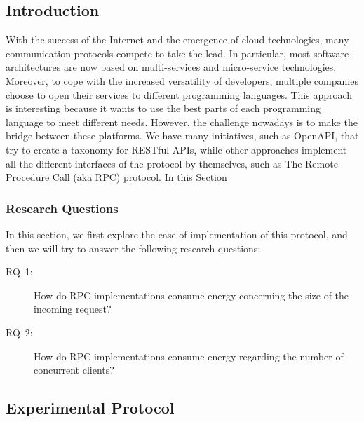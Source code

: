 \subsection{Introduction}
With the success of the Internet and the emergence of cloud technologies, many communication protocols compete to take the lead.
In particular, most software architectures are now based on multi-services and micro-service technologies.
Moreover, to cope with the increased versatility of developers, multiple companies choose to open their services to different programming languages.
This approach is interesting because it wants to use the best parts of each programming language to meet different needs.
However, the challenge nowadays is to make the bridge between these platforms.
We have many initiatives, such as OpenAPI, that try to create a taxonomy for RESTful APIs, while other approaches implement all the different interfaces of the protocol by themselves, such as The Remote Procedure Call (aka RPC) protocol.
In this Section

\subsubsection{Research Questions}
In this section, we first explore the ease of implementation of this protocol, and then we will try to answer the following research questions:
\begin{description}
    \item[\textsc{RQ}~1:] How do RPC implementations consume energy concerning the size of the incoming request?
    \item[\textsc{RQ}~2:] How do RPC implementations consume energy regarding the number of concurrent clients?
\end{description}

\subsection{Experimental Protocol}

